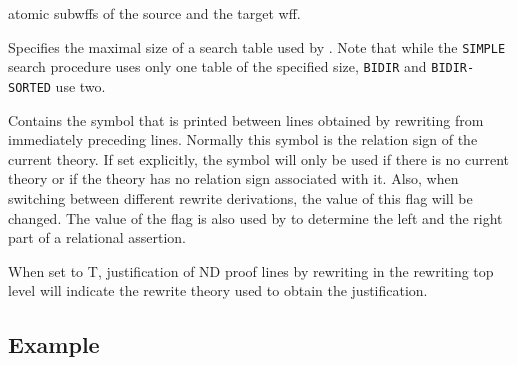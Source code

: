 \begin{description}
  atomic subwffs of the source and the target wff.
\item[]  Specifies the maximal size of a
  search table used by . Note that while the \texttt{SIMPLE}
  search procedure uses only one table of the specified size, \texttt{BIDIR}
  and \texttt{BIDIR-SORTED} use two.
\item[]  Contains the symbol that is
  printed between lines obtained by rewriting from immediately preceding lines.
  Normally this symbol is the relation sign of the current theory.
  If set explicitly, the symbol will only be used if there is no current
  theory or if the theory has no relation sign associated with it. Also, when
  switching between different rewrite derivations, the value of this flag will
  be changed. The value of the flag is also used by  to
  determine the left and the right part of a relational assertion.
\item[]  When set to T, justification
  of ND proof lines by rewriting in the rewriting top level will indicate the
  rewrite theory used to obtain the justification.
\end{description}


\subsection{Example} \label{RewritingTopLevelExample}

